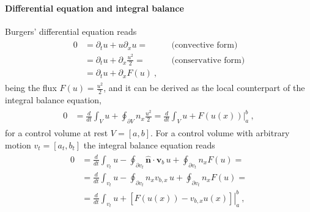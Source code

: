 \documentclass[letterpaper,10pt,english]{jupyterBook}
\begin{document}
\paragraph{Differential equation and integral balance}
\label{\detokenize{ch/pde/hyperbolic-1d-scalar-nonlinear:differential-equation-and-integral-balance}}\label{\detokenize{ch/pde/hyperbolic-1d-scalar-nonlinear:pde-hyperbolic-problems-scalar-nonlinear-examples-burgers-equations}}
\sphinxAtStartPar
Burgers’ differential equation reads
\begin{equation*}
\begin{split}\begin{aligned}
  0
  & = \partial_t u + u \partial_x u =            && \text{(convective form)}   \\
  & = \partial_t u + \partial_x \frac{u^2}{2} =  && \text{(conservative form)} \\
  & = \partial_t u + \partial_x F(u) \ ,
\end{aligned}\end{split}
\end{equation*}
\sphinxAtStartPar
being the flux \(F(u) = \frac{u^2}{2}\), and it can be derived as the local counterpart of the integral balance equation,
\begin{equation*}
\begin{split}\begin{aligned}
  0
  & = \frac{d}{dt} \int_V u + \oint_{\partial V} n_x \frac{u^2}{2}  
    = \frac{d}{dt} \int_V u + \left. F(u(x)) \right|_{a}^{b} \ ,
\end{aligned}\end{split}
\end{equation*}
\sphinxAtStartPar
for a control volume at rest \(V = [a, b]\). For a control volume with arbitrary motion \(v_t = [a_t, b_t]\) the integral balance equation reads
\begin{equation*}
\begin{split}\begin{aligned}
  0
  & = \frac{d}{dt} \int_{v_t} u - \oint_{\partial v_t} \hat{\mathbf{n}} \cdot \mathbf{v}_b \, u + \oint_{\partial v_t} n_x F(u) = \\
  & = \frac{d}{dt} \int_{v_t} u - \oint_{\partial v_t} n_x v_{b,x} \, u + \oint_{\partial v_t} n_x F(u) = \\
  & = \frac{d}{dt} \int_{v_t} u + \left. \left[ F(u(x)) - v_{b,x} u(x) \right] \right|_{a}^{b} \ ,
\end{aligned}\end{split}
\end{equation*}
\end{document}
